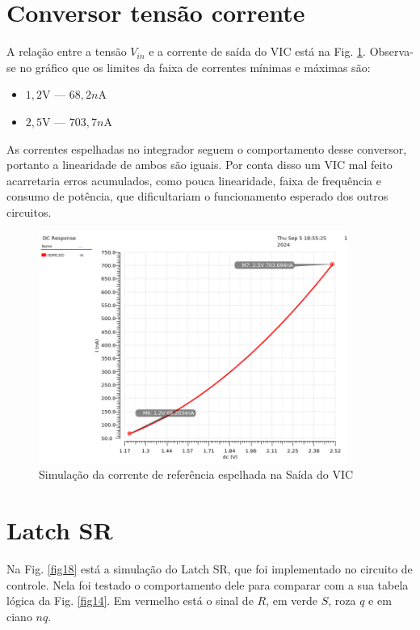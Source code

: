 \section{Conversor tensão corrente}

A relação entre a tensão $V_{in}$ e a corrente de saída do VIC está na Fig. \ref{fig17}. Observa-se no gráfico que os limites da faixa de correntes mínimas e máximas são:
\begin{itemize}
\item $1,2$V	 \----	$68,2n$A
\item $2,5$V \----	$703,7n$A
\end{itemize}




As correntes espelhadas no integrador seguem o comportamento desse conversor, portanto a linearidade de ambos são iguais. Por conta disso um VIC mal feito acarretaria erros acumulados, como pouca linearidade, faixa de frequência e consumo de potência, que dificultariam o funcionamento esperado dos outros circuitos.


\begin{figure}[htb]
	\centering
	\includegraphics[width=0.9\textwidth]{figuras/imgs_jv/sim_VIC2.png}
	\caption{ Simulação da corrente de referência espelhada na Saída do VIC }
	\label{fig17}
\end{figure}


\section{Latch SR}

Na Fig. \ref{fig18} está a simulação do Latch SR, que foi implementado no circuito de controle. Nela foi testado o comportamento dele para comparar com a sua tabela lógica da Fig. \ref{fig14}.  Em vermelho está o sinal de $R$, em verde $S$, roza $q$ e em ciano $nq$.

